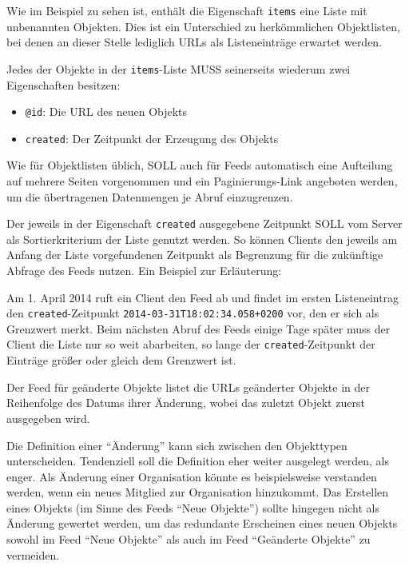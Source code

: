 \documentclass[,a4paper]{article}
\begin{document}
Wie im Beispiel zu sehen ist, enthält die Eigenschaft \texttt{items}
eine Liste mit unbenannten Objekten. Dies ist ein Unterschied zu
herkömmlichen Objektlisten, bei denen an dieser Stelle lediglich URLs
als Listeneinträge erwartet werden.

Jedes der Objekte in der \texttt{items}-Liste MUSS seinerseits wiederum
zwei Eigenschaften besitzen:

\begin{itemize}
\itemsep1pt\parskip0pt
\item
  \texttt{@id}: Die URL des neuen Objekts
\item
  \texttt{created}: Der Zeitpunkt der Erzeugung des Objekts
\end{itemize}

Wie für Objektlisten üblich, SOLL auch für Feeds automatisch eine
Aufteilung auf mehrere Seiten vorgenommen und ein Paginierungs-Link
angeboten werden, um die übertragenen Datenmengen je Abruf einzugrenzen.

Der jeweils in der Eigenschaft \texttt{created} ausgegebene Zeitpunkt
SOLL vom Server als Sortierkriterium der Liste genutzt werden. So können
Clients den jeweils am Anfang der Liste vorgefundenen Zeitpunkt als
Begrenzung für die zukünftige Abfrage des Feeds nutzen. Ein Beispiel zur
Erläuterung:

Am 1. April 2014 ruft ein Client den Feed ab und findet im ersten
Listeneintrag den \texttt{created}-Zeitpunkt
\texttt{2014-03-31T18:02:34.058+0200} vor, den er sich als Grenzwert
merkt. Beim nächsten Abruf des Feeds einige Tage später muss der Client
die Liste nur so weit abarbeiten, so lange der
\texttt{created}-Zeitpunkt der Einträge größer oder gleich dem Grenzwert
ist.


Der Feed für geänderte Objekte listet die URLs geänderter Objekte in der
Reihenfolge des Datums ihrer Änderung, wobei das zuletzt Objekt zuerst
ausgegeben wird.

Die Definition einer ``Änderung'' kann sich zwischen den Objekttypen
unterscheiden. Tendenziell soll die Definition eher weiter ausgelegt
werden, als enger. Als Änderung einer Organisation könnte es
beispielsweise verstanden werden, wenn ein neues Mitglied zur
Organisation hinzukommt. Das Erstellen eines Objekts (im Sinne des Feeds
``Neue Objekte'') sollte hingegen nicht als Änderung gewertet werden, um
das redundante Erscheinen eines neuen Objekts sowohl im Feed ``Neue
Objekte'' als auch im Feed ``Geänderte Objekte'' zu vermeiden.
\end{document}
